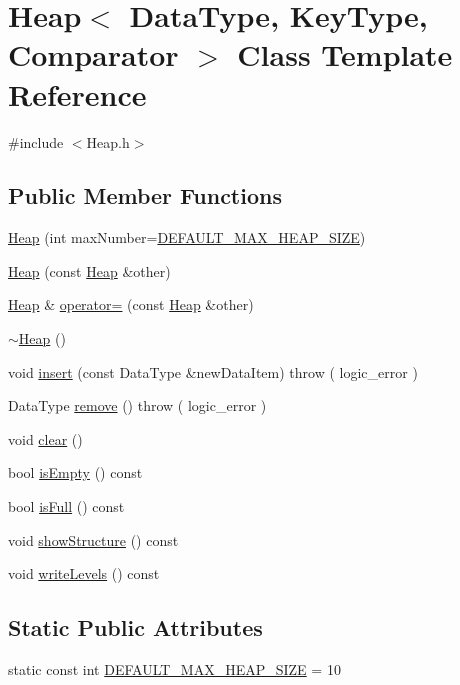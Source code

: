 \hypertarget{class_heap}{\section{Heap$<$ Data\-Type, Key\-Type, Comparator $>$ Class Template Reference}
\label{class_heap}
}


{\ttfamily \#include $<$Heap.\-h$>$}

\subsection*{Public Member Functions}
\begin{DoxyCompactItemize}
\item 
\hyperlink{class_heap_ae17e34e3c86d88263a8fdf80b9ba78fc}{Heap} (int max\-Number=\hyperlink{class_heap_a967c19732a20a72e8e824402ad6763c8}{D\-E\-F\-A\-U\-L\-T\-\_\-\-M\-A\-X\-\_\-\-H\-E\-A\-P\-\_\-\-S\-I\-Z\-E})
\item 
\hyperlink{class_heap_a97e3b462be1c6af31d7519546bba8907}{Heap} (const \hyperlink{class_heap}{Heap} \&other)
\item 
\hyperlink{class_heap}{Heap} \& \hyperlink{class_heap_a5ed119341c39bcea1437321d4247dd40}{operator=} (const \hyperlink{class_heap}{Heap} \&other)
\item 
\hyperlink{class_heap_a555ade7891007de959bef0ee53e28767}{$\sim$\-Heap} ()
\item 
void \hyperlink{class_heap_aa68cf80454ab1b246fa723612805a91e}{insert} (const Data\-Type \&new\-Data\-Item)  throw ( logic\-\_\-error )
\item 
Data\-Type \hyperlink{class_heap_a4a18bfdacd897c45fc3da13f22b8930d}{remove} ()  throw ( logic\-\_\-error )
\item 
void \hyperlink{class_heap_a19a78c8eae2cf7c8253e34e54d86ed73}{clear} ()
\item 
bool \hyperlink{class_heap_ab8fa26d416ac0e27dfcbf18c54f8f73f}{is\-Empty} () const 
\item 
bool \hyperlink{class_heap_ac9111b884c74a376240e0155a788756e}{is\-Full} () const 
\item 
void \hyperlink{class_heap_a3ae1e1f27a145749c8b9f2da777cb8bc}{show\-Structure} () const 
\item 
void \hyperlink{class_heap_a4bdb1772ea92899de245d6cbd217d085}{write\-Levels} () const 
\end{DoxyCompactItemize}
\subsection*{Static Public Attributes}
\begin{DoxyCompactItemize}
\item 
static const int \hyperlink{class_heap_a967c19732a20a72e8e824402ad6763c8}{D\-E\-F\-A\-U\-L\-T\-\_\-\-M\-A\-X\-\_\-\-H\-E\-A\-P\-\_\-\-S\-I\-Z\-E} = 10
\end{DoxyCompactItemize}


